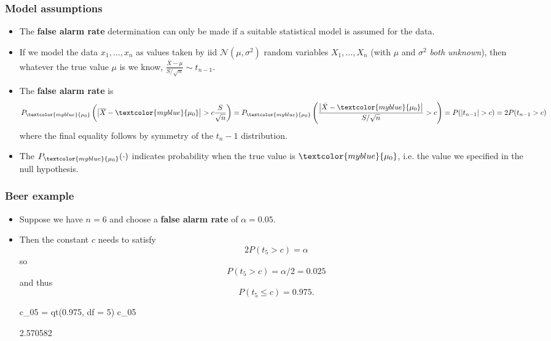 \documentclass[a4paper]{article}
\begin{document}
\subsubsection{Model assumptions}
\begin{itemize}
	\item The \textcolor{myred}{\textbf{false alarm rate}} determination can only be made if a suitable statistical model is assumed for the data.
	\item If we model the data \( x_1, \dotsc, x_n \) as values taken by iid \( \mathcal{N}(\mu,\sigma^2) \) random variables \( X_1, \dotsc, X_n \) (with \( \mu \) and \( \sigma^2 \) \textit{both unknown}), then whatever the true value \( \mu \) is we know, \( \frac{\overline{X}-\mu}{S/\sqrt{n}}\sim t_{n-1} \).
	\item The \textcolor{myred}{\textbf{false alarm rate}} is
	\[
		P_{\textcolor{myblue}{\mu_0}} \left( \left| \overline{X}-\textcolor{myblue}{\mu_0} \right| >c\frac{S}{\sqrt{n}} \right) = P_{\textcolor{myblue}{\mu_0}} \left( \frac{\left| \bar X-\textcolor{myblue}{\mu_0} \right|}{S/\sqrt{n}}>c \right)= P(|t_{n-1}|>c) = 2 P(t_{n-1}>c)
	\]where the final equality follows by symmetry of the 
	\( t_n-1 \) distribution.
	\item The \( P_{\textcolor{myblue}{\mu_0}}(\cdot) \) indicates probability when the true value is \( \textcolor{myblue}{\mu_0} \), i.e. the value we specified in the null hypothesis.
\end{itemize}
\subsubsection{Beer example}
\begin{itemize}
	\item Suppose we have \( n = 6 \) and choose a \textbf{false alarm rate} of \( \alpha = 0.05 \).
	\item Then the constant \( c \) needs to satisfy
	\[
		2P(t_5>c)=\alpha
	\]
	so
	\[
		P(t_5>c)=\alpha/2=0.025
	\]
	and thus
	\[
		P(t_5\leq c)=0.975.
	\]
\begin{Schunk}
\begin{Sinput}
c_05 = qt(0.975, df = 5)
c_05
\end{Sinput}
\begin{Soutput}
[1] 2.570582
\end{Soutput}
\end{Schunk}
\end{itemize}
\end{document}
